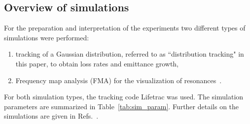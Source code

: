 \documentclass[%
 reprint,
 amsmath,amssymb,
 aps,
prstab,
]{revtex4-1}
\begin{document}
\subsection{Overview of simulations\label{sec:sim}}
For the preparation and interpretation of the experiments two different types of simulations were performed:
\begin{enumerate}
	\item tracking of a Gaussian distribution, referred to as ``distribution tracking" in this paper, to obtain loss rates and emittance growth,
	\item Frequency map analysis (FMA) for the visualization of resonances~\cite{fmalaskar}.
\end{enumerate}
For both simulation types, the tracking code Lifetrac \cite{lifetrac} was used. The simulation parameters are summarized in Table~\ref{tab:sim_param}. Further details on the simulations are given in Refs.~\cite{md_sim_hel_res_ex_fitterer,resexmd2017}.
\end{document}
